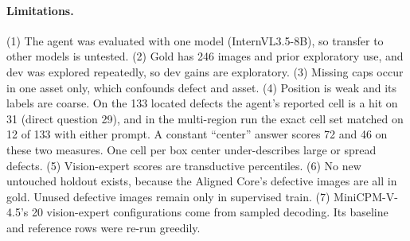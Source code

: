 \documentclass[11pt]{article}
\begin{document}
\paragraph{Limitations.} (1) The agent was evaluated with one model (InternVL3.5-8B), so transfer to other models is untested. (2) Gold has 246 images and prior exploratory use, and dev was explored repeatedly, so dev gains are exploratory. (3) Missing caps occur in one asset only, which confounds defect and asset. (4) Position is weak and its labels are coarse. On the 133 located defects the agent's reported cell is a hit on 31 (direct question 29), and in the multi-region run the exact cell set matched on 12 of 133 with either prompt. A constant ``center'' answer scores 72 and 46 on these two measures. One cell per box center under-describes large or spread defects. (5) Vision-expert scores are transductive percentiles. (6) No new untouched holdout exists, because the Aligned Core's defective images are all in gold. Unused defective images remain only in supervised train. (7) MiniCPM-V-4.5's 20 vision-expert configurations come from sampled decoding. Its baseline and reference rows were re-run greedily.
\end{document}
